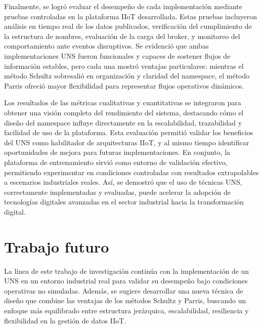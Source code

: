 Finalmente, se logró evaluar el desempeño de cada implementación mediante pruebas controladas en la plataforma IIoT desarrollada. Estas pruebas incluyeron análisis en tiempo real de los datos publicados, verificación del cumplimiento de la estructura de nombres, evaluación de la carga del broker, y monitoreo del comportamiento ante eventos disruptivos. Se evidenció que ambas implementaciones UNS fueron funcionales y capaces de sostener flujos de información estables, pero cada una mostró ventajas particulares: mientras el método Schultz sobresalió en organización y claridad del namespace, el método Parris ofreció mayor flexibilidad para representar flujos operativos dinámicos.

Los resultados de las métricas cualitativas y cuantitativas se integraron para obtener una visión completa del rendimiento del sistema, destacando cómo el diseño del namespace influye directamente en la escalabilidad, trazabilidad y facilidad de uso de la plataforma. Esta evaluación permitió validar los beneficios del UNS como habilitador de arquitecturas IIoT, y al mismo tiempo identificar oportunidades de mejora para futuras implementaciones. En conjunto, la plataforma de entrenamiento sirvió como entorno de validación efectivo, permitiendo experimentar en condiciones controladas con resultados extrapolables a escenarios industriales reales. Así, se demostró que el uso de técnicas UNS, correctamente implementadas y evaluadas, puede acelerar la adopción de tecnologías digitales avanzadas en el sector industrial hacia la transformación digital.


\section{Trabajo futuro}

La línea de este trabajo de investigación continúa con la implementación de un UNS en un entorno industrial real para validar su desempeño bajo condiciones operativas no simuladas. Además, se sugiere desarrollar una nueva técnica de diseño que combine las ventajas de los métodos Schultz y Parris, buscando un enfoque más equilibrado entre estructura jerárquica, escalabilidad, resiliencia y flexibilidad en la gestión de datos IIoT.
   
  